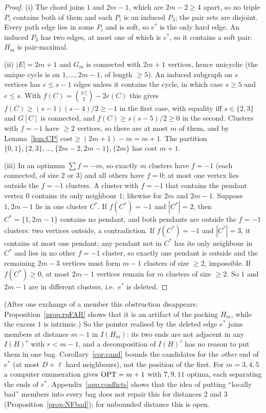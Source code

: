 \begin{proof}
(i) The chord joins $1$ and $2m-1$, which are $2m-2\ge4$ apart, so no triple $P_i$ contains both of them and each $P_i$ is an induced $P_3$; the pair sets are disjoint. Every path edge lies in some $P_i$ and is soft, so $e^*$ is the only hard edge. An induced $P_3$ has two edges, at most one of which is $e^*$, so it contains a soft pair: $H_m$ is pair-maximal.

(ii) $|E|=2m+1$ and $G_m$ is connected with $2m+1$ vertices, hence unicyclic (the unique cycle is on $1,\dots,2m-1$, of length $\ge5$). An induced subgraph on $s$ vertices has $e\le s-1$ edges unless it contains the cycle, in which case $s\ge5$ and $e\le s$. With $f(C)=\binom{|C|}2-2e(C)$ this gives $f(C)\ge(s-1)(s-4)/2\ge-1$ in the first case, with equality iff $s\in\{2,3\}$ and $G[C]$ is connected, and $f(C)\ge s(s-5)/2\ge0$ in the second. Clusters with $f=-1$ have $\ge2$ vertices, so there are at most $m$ of them, and by Lemma~\ref{lem:CP} $\mathrm{cost}\ge(2m+1)-m=m+1$. The partition $\{0,1\},\{2,3\},\dots,\{2m-2,2m-1\},\{2m\}$ has cost $m+1$.

(iii) In an optimum $\sum f=-m$, so exactly $m$ clusters have $f=-1$ (each connected, of size $2$ or $3$) and all others have $f=0$; at most one vertex lies outside the $f=-1$ clusters. A cluster with $f=-1$ that contains the pendant vertex $0$ contains its only neighbour $1$; likewise for $2m$ and $2m-1$. Suppose $1,2m-1$ lie in one cluster $C^*$. If $f(C^*)=-1$ and $|C^*|=2$, then $C^*=\{1,2m-1\}$ contains no pendant, and both pendants are outside the $f=-1$ clusters: two vertices outside, a contradiction. If $f(C^*)=-1$ and $|C^*|=3$, it contains at most one pendant; any pendant not in $C^*$ has its only neighbour in $C^*$ and lies in no other $f=-1$ cluster, so exactly one pendant is outside and the remaining $2m-3$ vertices must form $m-1$ clusters of size $\ge2$, impossible. If $f(C^*)\ge0$, at most $2m-1$ vertices remain for $m$ clusters of size $\ge2$. So $1$ and $2m-1$ are in different clusters, i.e.\ $e^*$ is deleted.
\end{proof}
(After one exchange of a member this obstruction disappears: Proposition~\ref{prop:rpFAR} shows that it is an artifact of the packing $H_m$, while the excess $1$ is intrinsic.) So the pointer realised by the deleted edge $e^*$ joins members at distance $m-1$ in $I(H_m)$: its two ends are not adjacent in any $I(H)^r$ with $r<m-1$, and a decomposition of $I(H)^r$ has no reason to put them in one bag. Corollary~\ref{cor:cand} bounds the candidates for the \emph{other} end of $e^*$ (at most $D+\ell$ hard neighbours), not the position of the first. For $m=3,4,5$ a computer enumeration gives $\mathrm{OPT}=m+1$ with $7,9,11$ optima, each separating the ends of $e^*$. Appendix~\ref{app:conflicts} shows that the idea of putting ``locally bad'' members into every bag does not repair this for distances $2$ and $3$ (Proposition~\ref{prop:NFbad}); for unbounded distance this is open.
